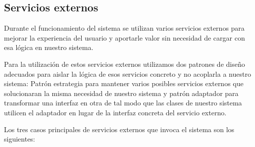 \documentclass[12pt, a4paper, twoside]{book}
\begin{document}
	\subsection{Servicios externos}
	
	Durante el funcionamiento del sistema se utilizan varios servicios externos para mejorar la experiencia del usuario y aportarle valor sin necesidad de cargar con esa lógica en nuestro sistema.
	
	Para la utilización de estos servicios externos utilizamos dos patrones de diseño adecuados para aislar la lógica de esos servicios concreto y no acoplarla a nuestro sistema: Patrón estrategia para mantener varios posibles servicios externos que solucionaran la misma necesidad de nuestro sistema y patrón adaptador para transformar una interfaz en otra de tal modo que las clases de nuestro sistema utilicen el adaptador en lugar de la interfaz concreta del servicio externo.
	
	Los tres casos principales de servicios externos que invoca el sistema son los siguientes:
	
\end{document}
